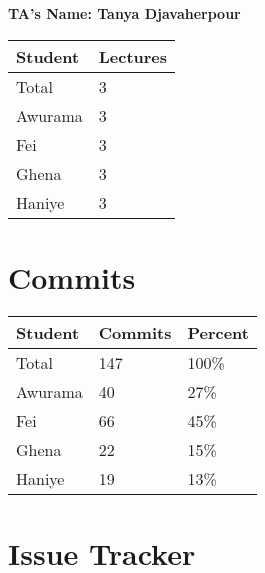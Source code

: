 \documentclass{article}
\begin{document}

\noindent \textbf{TA's Name: Tanya Djavaherpour}

\begin{table}[H]
\centering
\begin{tabular}{ll}
\toprule
\textbf{Student} & \textbf{Lectures}\\
\midrule
Total & 3\\
Awurama & 3\\
Fei & 3\\
Ghena & 3\\
Haniye & 3\\
\bottomrule
\end{tabular}
\end{table}

\section{Commits}


\begin{table}[H]
\centering
\begin{tabular}{lll}
\toprule
\textbf{Student} & \textbf{Commits} & \textbf{Percent}\\
\midrule
Total & 147 & 100\% \\
Awurama & 40& 27\% \\
Fei & 66& 45\% \\
Ghena & 22& 15\% \\
Haniye & 19& 13\% \\
\bottomrule
\end{tabular}
\end{table}

\section{Issue Tracker}

\end{document}
